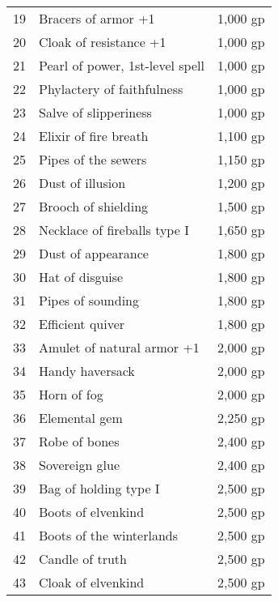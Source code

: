 \begin{table}[]
\begin{tabularx}{\linewidth}{lXl}
19  & Bracers of armor +1                         & 1,000 gp     \\
20  & Cloak of resistance +1                      & 1,000 gp     \\
21  & Pearl of power, 1st-level spell             & 1,000 gp     \\
22  & Phylactery of faithfulness                  & 1,000 gp     \\
23  & Salve of slipperiness                       & 1,000 gp     \\
24  & Elixir of fire breath                       & 1,100 gp     \\
25  & Pipes of the sewers                         & 1,150 gp     \\
26  & Dust of illusion                            & 1,200 gp     \\
27  & Brooch of shielding                         & 1,500 gp     \\
28  & Necklace of fireballs type I                & 1,650 gp     \\
29  & Dust of appearance                          & 1,800 gp     \\
30  & Hat of disguise                             & 1,800 gp     \\
31  & Pipes of sounding                           & 1,800 gp     \\
32  & Efficient quiver                            & 1,800 gp     \\
33  & Amulet of natural armor +1                  & 2,000 gp     \\
34  & Handy haversack                             & 2,000 gp     \\
35  & Horn of fog                                 & 2,000 gp     \\
36  & Elemental gem                               & 2,250 gp     \\
37  & Robe of bones                               & 2,400 gp     \\
38  & Sovereign glue                              & 2,400 gp     \\
39  & Bag of holding type I                       & 2,500 gp     \\
40  & Boots of elvenkind                          & 2,500 gp     \\
41  & Boots of the winterlands                    & 2,500 gp     \\
42  & Candle of truth                             & 2,500 gp     \\
43  & Cloak of elvenkind                          & 2,500 gp     \\

\end{tabularx}
\end{table}
